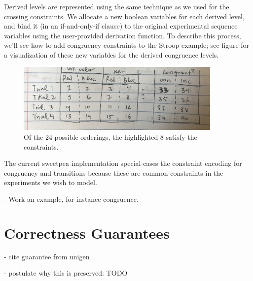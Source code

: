 Derived levels are represented using the same technique as we used for the crossing constraints. We allocate a new boolean variables for each derived level, and bind it (in an if-and-only-if clause) to the original experimental sequence variables using the user-provided derivation function. To describe this process, we'll see how to add congruency constraints to the Stroop example; see figure  for a visualization of these new variables for the derived congruence levels.

\begin{figure}[t]
    \centerline{\includegraphics[origin=c,width=10cm]{fig_congruence_vars_stroop}}
    \caption{Of the 24 possible orderings, the highlighted 8 satisfy the constraints.}%
    \label{fig:congruence_vars_stroop}%
\end{figure}

The current sweetpea implementation special-cases the constraint encoding for congruency and transitions because these are common constraints in the experiments we wish to model.


- Work an example, for instance congruence.


\section{Correctness Guarantees}

- cite guarantee from unigen

- postulate why this is preserved: TODO
